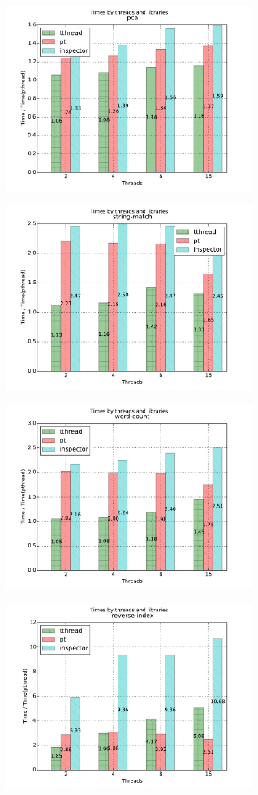 \begin{figure}[h]
\includegraphics[width=8cm]{figure/pca.pdf}
\end{figure}

\begin{figure}[h]
\includegraphics[width=8cm]{figure/string-match.pdf}
\end{figure}

\begin{figure}[h]
\includegraphics[width=8cm]{figure/word-count.pdf}
\end{figure}

\begin{figure}[h]
\includegraphics[width=8cm]{figure/reverse-index.pdf}
\end{figure}

